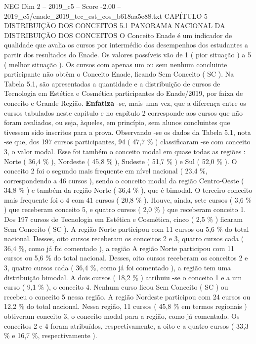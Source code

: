 \begin{textsample}{NEG Dim 2 – 2019\_c5 – Score -2.00 – 2019\_c5/enade\_2019\_tec\_est\_cos\_b618aa5e88.txt}  \label{ex:f2_neg_098}
CAPÍTULO 5 DISTRIBUIÇÃO DOS CONCEITOS 5.1 PANORAMA NACIONAL DA DISTRIBUIÇÃO DOS CONCEITOS O Conceito Enade é um indicador de qualidade que avalia os cursos por intermédio dos desempenhos dos estudantes a partir dos resultados do Enade.
Os valores possíveis vão de 1 ( pior situação ) a 5 ( melhor situação ).
Os cursos com apenas um ou sem nenhum concluinte participante não obtêm o Conceito Enade, ficando Sem Conceito ( SC ).
Na Tabela 5.1, são apresentadas a quantidade e a distribuição de cursos de Tecnologia em Estética e Cosmética participantes do Enade/2019, por faixa de conceito e Grande Região. \textbf{Enfatiza} -se, mais uma vez, que a diferença entre os cursos tabulados neste capítulo e no capítulo 2 corresponde aos cursos que não foram avaliados, ou seja, àqueles, em princípio, sem alunos concluintes que tivessem sido inscritos para a prova.
Observando -se os dados da Tabela 5.1, nota -se que, dos 197 cursos participantes, 94 ( 47,7 \% ) classificaram -se com conceito 3, o valor modal.
Esse foi também o conceito modal em quase todas as regiões : Norte ( 36,4 \% ), Nordeste ( 45,8 \% ), Sudeste ( 51,7 \% ) e Sul ( 52,0 \% ).
O conceito 2 foi o segundo mais frequente em nível nacional ( 23,4 \%, correspondendo a 46 cursos ), sendo o conceito modal da região Centro-Oeste ( 34,8 \% ) e também da região Norte ( 36,4 \% ), que é bimodal.
O terceiro conceito mais frequente foi o 4 com 41 cursos ( 20,8 \% ).
Houve, ainda, sete cursos ( 3,6 \% ) que receberam conceito 5, e quatro cursos ( 2,0 \% ) que receberam conceito 1.
Dos 197 cursos de Tecnologia em Estética e Cosmética, cinco ( 2,5 \% ) ficaram Sem Conceito ( SC ).
A região Norte participou com 11 cursos ou 5,6 \% do total nacional.
Desses, oito cursos receberam os conceitos 2 e 3, quatro cursos cada ( 36,4 \%, como já foi comentado ), a região A região Norte participou com 11 cursos ou 5,6 \% do total nacional.
Desses, oito cursos receberam os conceitos 2 e 3, quatro cursos cada ( 36,4 \%, como já foi comentado ), a região tem uma distribuição bimodal.
A dois cursos ( 18,2 \% ) atribuiu -se o conceito 1 e a um curso ( 9,1 \% ), o conceito 4.
Nenhum curso ficou Sem Conceito ( SC ) ou recebeu o conceito 5 nessa região.
A região Nordeste participou com 24 cursos ou 12,2 \% do total nacional.
Nessa região, 11 cursos ( 45,8 \% em termos regionais ) obtiveram conceito 3, o conceito modal para a região, como já comentado.
Os conceitos 2 e 4 foram atribuídos, respectivamente, a oito e a quatro cursos ( 33,3 \% e 16,7 \%, respectivamente ).

\end{textsample}
